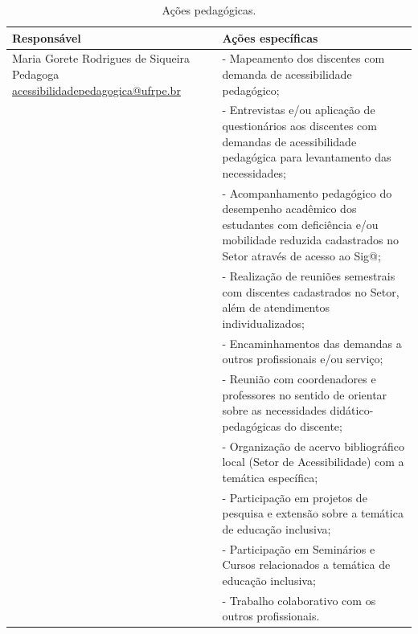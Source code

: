 \documentclass[
	12pt,				%
	openright,			%
  oneside,     %
	a4paper,			%
 hyphens,
	chapter=TITLE,		%
	english,			%
	french,				%
	spanish,			%
	brazil				%
	]{abntex2}
\begin{document}
\begin{center}
  
  \begin{scriptsize}
    \begin{longtable}{p{5cm}p{9cm}}
      \caption{\label{quadro:acoes-pedagogicas}Ações pedagógicas.}\\
      \toprule
      \textbf{Responsável} & \textbf{Ações específicas}\\ 
        \midrule
        Maria Gorete Rodrigues de Siqueira \newline Pedagoga \newline \href{mailto:acessibilidadepedagogica@ufrpe.br}{acessibilidadepedagogica@ufrpe.br} 
        & - Mapeamento dos discentes com demanda de acessibilidade pedagógico;\\
        & - Entrevistas e/ou aplicação de questionários aos discentes com demandas de acessibilidade pedagógica para levantamento das necessidades;\\
        \addlinespace
        & - Acompanhamento pedagógico do desempenho acadêmico dos estudantes com deficiência e/ou mobilidade reduzida cadastrados no Setor através de acesso ao Sig@;\\
        \addlinespace
        & - Realização de reuniões semestrais com discentes cadastrados no Setor, além de atendimentos individualizados;\\
        \addlinespace
        & - Encaminhamentos das demandas a outros profissionais e/ou serviço;\\
        \addlinespace
        & - Reunião com coordenadores e professores no sentido de orientar sobre as necessidades didático-pedagógicas do discente;\\
        \addlinespace
        & - Organização de acervo bibliográfico local (Setor de Acessibilidade) com a temática específica;\\
        \addlinespace
        & - Participação em projetos de pesquisa e extensão sobre a temática de educação inclusiva;	\\
        \addlinespace
        & - Participação em Seminários e Cursos relacionados a temática de educação inclusiva;		\\
        \addlinespace
        & - Trabalho colaborativo com os outros profissionais.\\
        
      \bottomrule
\end{longtable}
\end{scriptsize}      
\end{center}
\end{document}
